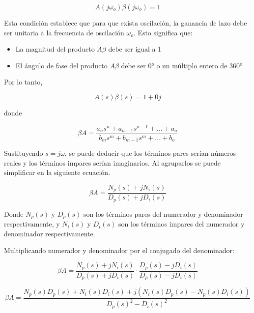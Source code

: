 \begin{equation}
  A(j\omega_o)\beta(j\omega_o) = 1
  \label{eq:condicion-barkhausen}
\end{equation}

Esta condición establece que para que exista oscilación, la ganancia de lazo debe ser unitaria a la frecuencia de oscilación $\omega_o$. Esto significa que:

\begin{itemize}
  \item La magnitud del producto $A\beta$ debe ser igual a 1
  \item El ángulo de fase del producto $A\beta$ debe ser 0° o un múltiplo entero de 360°
\end{itemize}

Por lo tanto,

\begin{equation}
  A(s)\beta(s) = 1 + 0j
  \label{eq:ganancia-oscilacion}
\end{equation}

donde

\begin{equation}
  \beta A = \frac{a_n s^n + a_{n-1} s^{n-1} + ... + a_o}{b_m s^m + b_{m-1} s^m + ... + b_o}
  \label{eq:ganancia-lazo}
\end{equation}

Sustituyendo $s = j\omega$, se puede deducir que los términos pares serían números reales y los términos impares serían imaginarios. Al agruparlos se puede simplificar en la siguiente ecuación.

\begin{equation}
  \beta A = \frac{N_p(s) + jN_i(s)}{D_p(s) + jD_i(s)}
  \label{eq:ganancia-lazo-simplificada}
\end{equation}

Donde $N_p(s)$ y $D_p(s)$ son los términos pares del numerador y denominador respectivamente, y $N_i(s)$ y $D_i(s)$ son los términos impares del numerador y denominador respectivamente.

Multiplicando numerador y denominador por el conjugado del denominador:

\begin{equation}
  \beta A = \frac{N_p(s) + jN_i(s)}{D_p(s) + jD_i(s)} \cdot \frac{D_p(s) - jD_i(s)}{D_p(s) - jD_i(s)}
  \label{eq:ganancia-lazo-conjugado}
\end{equation}

\begin{equation}
  \beta A = \frac{N_p(s)D_p(s) + N_i(s)D_i(s) + j(N_i(s)D_p(s) - N_p(s)D_i(s))}{D_p(s)^2 - D_i(s)^2}
  \label{eq:ganancia-lazo-final}
\end{equation}

